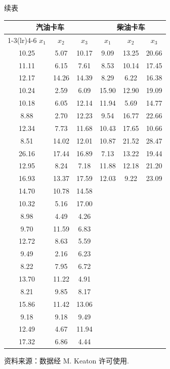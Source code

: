 
\begin{mvtable}
{\hfill 续表\par}\vspace{2pt}
\begin{tabular}{ccc|ccc}
\toprule
\multicolumn{3}{c}{汽油卡车} & \multicolumn{3}{c}{柴油卡车} \\
\cmidrule(lr){1-3}\cmidrule(lr){4-6}
$x_{1}$ & $x_{2}$ & $x_{3}$ & $x_{1}$ & $x_{2}$ & $x_{3}$ \\
\midrule
10.25 & 5.07 & 10.17 & 9.09 & 13.25 & 20.66 \\
11.11 & 6.15 & 7.61 & 8.53 & 10.14 & 17.45 \\
12.17 & 14.26 & 14.39 & 8.29 & 6.22 & 16.38 \\
10.24 & 2.59 & 6.09 & 15.90 & 12.90 & 19.09 \\
10.18 & 6.05 & 12.14 & 11.94 & 5.69 & 14.77 \\
8.88 & 2.70 & 12.23 & 9.54 & 16.77 & 22.66 \\
12.34 & 7.73 & 11.68 & 10.43 & 17.65 & 10.66 \\
8.51 & 14.02 & 12.01 & 10.87 & 21.52 & 28.47 \\
26.16 & 17.44 & 16.89 & 7.13 & 13.22 & 19.44 \\
12.95 & 8.24 & 7.18 & 11.88 & 12.18 & 21.20 \\
16.93 & 13.37 & 17.59 & 12.03 & 9.22 & 23.09 \\
14.70 & 10.78 & 14.58 & & & \\
10.32 & 5.16 & 17.00 & & & \\
8.98 & 4.49 & 4.26 & & & \\
9.70 & 11.59 & 6.83 & & & \\
12.72 & 8.63 & 5.59 & & & \\
9.49 & 2.16 & 6.23 & & & \\
8.22 & 7.95 & 6.72 & & & \\
13.70 & 11.22 & 4.91 & & & \\
8.21 & 9.85 & 8.17 & & & \\
15.86 & 11.42 & 13.06 & & & \\
9.18 & 9.18 & 9.49 & & & \\
12.49 & 4.67 & 11.94 & & & \\
17.32 & 6.86 & 4.44 & & & \\
\bottomrule
\end{tabular}
\end{mvtable}

{ 资料来源：数据经 M. Keaton 许可使用.}

